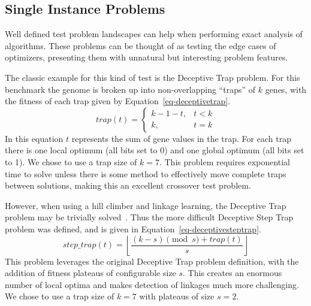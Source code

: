\documentclass{sig-alternate}
\begin{document}
\begin{comment}
In practice it is often more important to find a good solution quickly than find
the best solution after an exceedingly high number of evaluations.  However, even
a cursory consideration of P3's operators should convince one of its ability to
find high quality solutions in very few evaluations.  This is specifically true of the iterative
application of the first improvement hill climber and the exceptionally elitist
crossover operator.  Therefore we feel it is more important to test P3's resistance
to premature convergence, as that seems a more likely flaw than being slow to reach
``good enough'' solutions.
\end{comment}

\subsection{Single Instance Problems}
Well defined test problem landscapes can help when performing exact analysis of
algorithms.  These problems can be thought of as testing the edge cases of optimizers,
presenting them with unnatural but interesting problem features.

The classic example for this kind of test is the Deceptive Trap problem.
For this benchmark the genome is broken up into non-overlapping ``traps'' of $k$
genes, with the fitness of each trap given by Equation~\ref{eq-deceptivetrap}.
\begin{equation}
   trap(t) = \left\{
     \begin{array}{rl}
       k-1-t, &  t<k\\
       k,   &  t = k
     \end{array}
   \right.
  \label{eq-deceptivetrap}
\end{equation}
In this equation $t$ represents the sum of gene values in the trap.  For each trap
there is one local optimum (all bits set to 0) and one global optimum (all bits set to 1).
We chose to use a trap size of $k=7$.
This problem requires exponential time to solve unless there is some method to effectively
move complete traps between solutions, making this an excellent crossover test problem.

However, when using a hill climber and linkage learning, the Deceptive Trap problem
may be trivially solved~\cite{goldman:2012:ltga}.  Thus the more
difficult Deceptive Step Trap
problem was defined, and is given in Equation~\ref{eq-deceptivesteptrap}.
\begin{equation}
   step\_trap(t) = \left \lfloor \frac{(k-s)\pmod{s} + trap(t)}{s} \right \rfloor
  \label{eq-deceptivesteptrap}
\end{equation}
This problem leverages the original Deceptive Trap problem definition, with the
addition of fitness plateaus of configurable size $s$.  This creates an enormous
number of local optima and makes detection of linkages much more challenging.  We
chose to use a trap size of $k=7$ with plateaus of size $s=2$.
\end{document}
